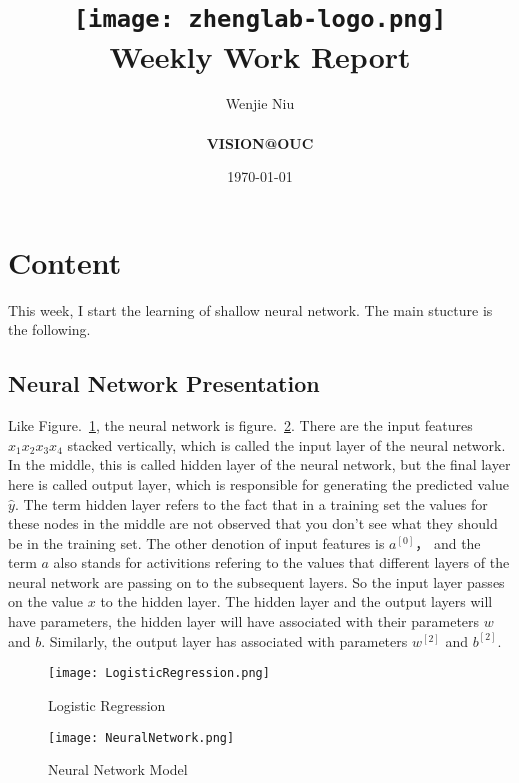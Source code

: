 \documentclass[a4paper]{article}
\title{
    \vspace*{1in}
    \texttt{[image: zhenglab-logo.png]} \\
    \vspace*{1.2in}
    \textbf{\huge Weekly Work Report}
    \vspace{0.2in}
}
\author{Wenjie Niu \\
    \vspace*{0.5in} \\
    \textbf{VISION@OUC} \\
    \vspace*{1in}
}
\date{\today}
\begin{document}
\maketitle
\setcounter{page}{0}
\thispagestyle{empty}
\newpage


\section{Content}
This week, I start the learning of shallow neural network. The main stucture is the following.
\subsection{Neural Network Presentation}
Like Figure.~\ref{fig:Logisti}, the neural network is figure.~\ref{fig:NeuralNetwork}. There are the input features $x_1 x_2 x_3 x_4$ stacked  vertically, which is called the input layer of the neural network. In the middle, this is called hidden layer of the neural network, but the final layer here is called output layer, which is responsible for generating the predicted value $\hat{y}$. The term hidden layer refers to the fact that in a training set the values for these nodes in the middle are not observed that you don't see what they should be in the training set. The other denotion of input features is $a^{[0]}$， and the term $a$ also stands for activitions refering to the values that different layers of the neural network are passing on to the subsequent layers. So the input layer passes on the value $x$ to the hidden layer. The hidden layer and the output layers will have parameters, the hidden layer will have associated with their parameters $w$ and $b$. Similarly, the output layer has associated with parameters $w^{[2]}$ and $b^{[2]}$.

\begin{figure}[!htp]
\begin{center}
   \texttt{[image: LogisticRegression.png]}
\end{center}
   \caption{Logistic Regression~\cite{mooc.com,Coursera.org}}
\label{fig:Logisti}
\end{figure}


\begin{figure}[!htp]
\begin{center}
   \texttt{[image: NeuralNetwork.png]}
\end{center}
   \caption{Neural Network Model~\cite{mooc.com,Coursera.org}}
\label{fig:NeuralNetwork}
\end{figure}
\end{document}
